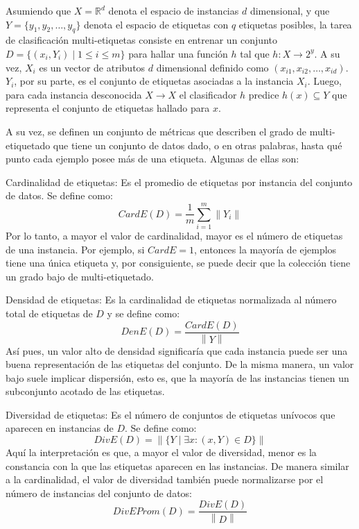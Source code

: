 Asumiendo que $X=\mathbb{R}^{d}$ denota el espacio de instancias $d$
dimensional, y que $Y = \{y_{1}, y_{2}, \dots, y_{q}\}$ denota el espacio de
etiquetas con $q$ etiquetas posibles, la tarea de clasificación multi-etiquetas
consiste en entrenar un conjunto $D = \{(x_{i}, Y_{i}) \mid 1 \leq i \leq m\}$
para hallar una función $h$ tal que $h: X \rightarrow 2^y$. A su vez, $X_{i}$ es
un vector de atributos $d$ dimensional definido como $(x_{i1}, x_{i2}, \dots,
x_{id})$. $Y_{i}$, por su parte, es el conjunto de etiquetas asociadas a la
instancia $X_{i}$. Luego, para cada instancia desconocida $X \rightarrow X$ el
clasificador $h$ predice $h(x) \subseteq Y$ que representa el conjunto de
etiquetas hallado para $x$.

A su vez, se definen un conjunto de métricas que describen el grado de
multi-etiquetado que tiene un conjunto de datos dado, o en otras palabras, hasta
qué punto cada ejemplo posee más de una etiqueta. Algunas de ellas son: 

\begin{description}
   \item{Cardinalidad de etiquetas}: Es el promedio de etiquetas por instancia
      del conjunto de datos. Se define como: 
      \begin{equation}
      \label{eq:mll_card}
         CardE(D) = \frac{1}{m} \sum_{i=1}^{m} \left\|Y_{i}\right\|
      \end{equation}
      Por lo tanto, a mayor el valor de cardinalidad, mayor es el número de
      etiquetas de una instancia. Por ejemplo, si $CardE = 1$, entonces la
      mayoría de ejemplos tiene una única etiqueta y, por consiguiente, se puede
      decir que la colección tiene un grado bajo de multi-etiquetado.  
   \item{Densidad de etiquetas}: Es la cardinalidad de etiquetas normalizada al
      número total de etiquetas de $D$ y se define como:
      \begin{equation}
         DenE(D) = \frac{CardE(D)}{\left\|Y\right\|}
      \end{equation}
      Así pues, un valor alto de densidad significaría que cada instancia puede
      ser una buena representación de las etiquetas del conjunto. De la misma
      manera, un valor bajo suele implicar dispersión, esto es, que la mayoría
      de las instancias tienen un subconjunto acotado de las etiquetas. 
   \item{Diversidad de etiquetas}: Es el número de conjuntos de etiquetas
      unívocos que aparecen en instancias de $D$. Se define como:
      \begin{equation}
         DivE(D) = \left\|\{Y \mid \exists x: (x, Y) \in D\}\right\|
      \end{equation}
      Aquí la interpretación es que, a mayor el valor de diversidad, menor es la
      constancia con la que las etiquetas aparecen en las instancias. De manera
      similar a la cardinalidad, el valor de diversidad también puede
      normalizarse por el número de instancias del conjunto de datos: 
      \begin{equation}
         DivEProm(D) = \frac{DivE(D)}{\left\|D\right\|}
      \end{equation}
\end{description}

